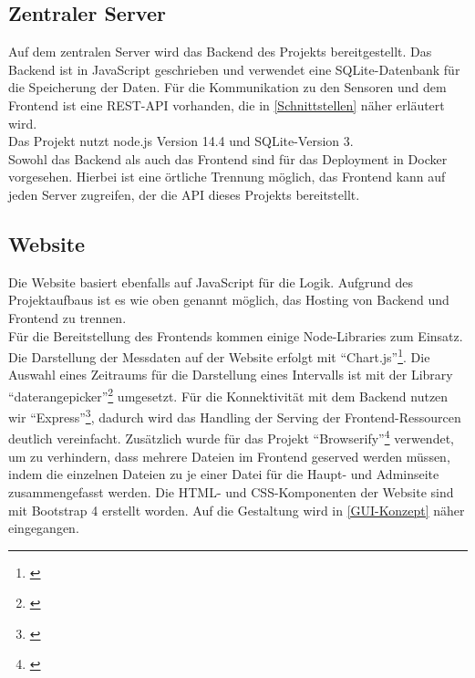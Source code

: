 \subsection{Zentraler Server}%
Auf dem zentralen Server wird das Backend des Projekts bereitgestellt. Das Backend ist in JavaScript geschrieben und verwendet eine SQLite-Datenbank für die Speicherung der Daten. Für die Kommunikation zu den Sensoren und dem Frontend ist eine REST-API vorhanden, die in \autoref{Schnittstellen} näher erläutert wird.\\
Das Projekt nutzt node.js Version 14.4 und SQLite-Version 3.\\
Sowohl das Backend als auch das Frontend sind für das Deployment in Docker vorgesehen. Hierbei ist eine örtliche Trennung möglich, das Frontend kann auf jeden Server zugreifen, der die API dieses Projekts bereitstellt.

\subsection{Website}
Die Website basiert ebenfalls auf JavaScript für die Logik. Aufgrund des Projektaufbaus ist es wie oben genannt möglich, das Hosting von Backend und Frontend zu trennen.\\
Für die Bereitstellung des Frontends kommen einige Node-Libraries zum Einsatz. Die Darstellung der Messdaten auf der Website erfolgt mit \enquote{Chart.js}\footnote{\cite{chartjs.2020}}. Die Auswahl eines Zeitraums für die Darstellung eines Intervalls ist mit der Library \enquote{daterangepicker}\footnote{\cite{daterangepicker.2020}} umgesetzt. Für die Konnektivität mit dem Backend nutzen wir \enquote{Express}\footnote{\cite{express.2020}}, dadurch wird das Handling der Serving der Frontend-Ressourcen deutlich vereinfacht. Zusätzlich wurde für das Projekt \enquote{Browserify}\footnote{\cite{browserify.2020}} verwendet, um zu verhindern, dass mehrere Dateien im Frontend geserved werden müssen, indem die einzelnen Dateien zu je einer Datei für die Haupt- und Adminseite zusammengefasst werden.
Die HTML- und CSS-Komponenten der Website sind mit Bootstrap 4 erstellt worden. Auf die Gestaltung wird in \autoref{GUI-Konzept} näher eingegangen.